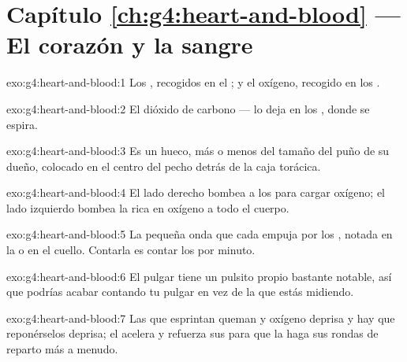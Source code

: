 \section*{Capítulo \ref{ch:g4:heart-and-blood} --- El corazón y la sangre}

\begin{solution}{exo:g4:heart-and-blood:1}
Los , recogidos en el ; y el oxígeno,
recogido en los .
\end{solution}

\begin{solution}{exo:g4:heart-and-blood:2}
El dióxido de carbono --- lo deja en los , donde se espira.
\end{solution}

\begin{solution}{exo:g4:heart-and-blood:3}
Es un  hueco, más o menos del tamaño del puño de su dueño,
colocado en el centro del pecho detrás de la caja torácica.
\end{solution}

\begin{solution}{exo:g4:heart-and-blood:4}
El lado derecho bombea  a los  para cargar oxígeno; el
lado izquierdo bombea la  rica en oxígeno a todo el cuerpo.
\end{solution}

\begin{solution}{exo:g4:heart-and-blood:5}
La pequeña onda que cada  empuja por los , notada en la
 o en el cuello. Contarla es contar los  por minuto.
\end{solution}

\begin{solution}{exo:g4:heart-and-blood:6}
El pulgar tiene un pulsito propio bastante notable, así que podrías
acabar contando tu pulgar en vez de la  que estás midiendo.
\end{solution}

\begin{solution}{exo:g4:heart-and-blood:7}
Las  que esprintan queman  y oxígeno deprisa y hay
que reponérselos deprisa; el  acelera y refuerza sus 
para que la  haga sus rondas de reparto más a menudo.
\end{solution}

